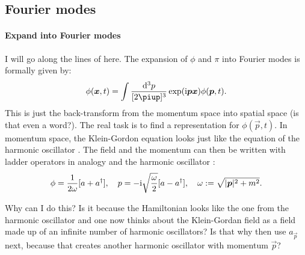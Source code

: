 \documentclass[11pt, english, fleqn, DIV=15, headinclude, BCOR=1cm]{scrartcl}
\begin{document}
\subsection{Fourier modes}

\paragraph{Expand into Fourier modes}

I will go along the lines of \textcite[§\,2.3]{Peskin/QFT/1995} here. The
expansion of $\phi$ and $\pi$ into Fourier modes is formally given by:
\[
    \phi(\vec x, t) = \int \frac{\dif^3p}{[2\piup]^3} \exp(\iup \vec p \vec x)
    \phi(\vec p, t).
\]
This is just the back-transform from the momentum space into spatial space (is
that even a word?). The real task is to find a representation for $\phi(\vec p,
t)$. In momentum space, the Klein-Gordon equation looks just like the equation
of the harmonic oscillator \parencite[(2.21)]{Peskin/QFT/1995}. The field and
the momentum can then be written with ladder operators in analogy and the
harmonic oscillator
\parencite[(2.23)]{Peskin/QFT/1995}:
\[
    \phi = \frac{1}{2 \omega} [a + a^\dagger]
    ,\quad
    p = - \mathrm i \sqrt{\frac{\omega}{2}} [a - a^\dagger]
    ,\quad
    \omega := \sqrt{|\boldsymbol{p}|^2 + m^2}.
\]

\begin{question}
    Why can I do this? Is it because the Hamiltonian looks like the one from
    the harmonic oscillator and one now thinks about the Klein-Gordan field as
    a field made up of an infinite number of harmonic oscillators? Is that why
    \textcite[(2.25)]{Peskin/QFT/1995} then use $a_{\vec p}$ next, because that
    creates another harmonic oscillator with momentum $\vec p$?
\end{question}
\end{document}
